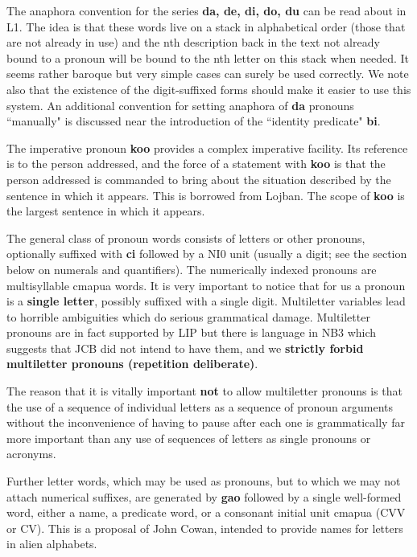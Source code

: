 \documentclass[12pt]{book}
\begin{document}
The anaphora convention for the series {\bf da, de, di, do, du} can be read about in L1.  The idea is that these words live on a stack in alphabetical order (those that are not already in use) and the nth description back in the text not already bound to a pronoun will be bound to the nth letter on this stack when needed.   It seems rather baroque but very simple cases can surely be used correctly.  We note also that the existence of the digit-suffixed forms should make it easier to use this system.  An additional convention for setting anaphora of {\bf da} pronouns ``manually" is discussed near the introduction of the ``identity predicate" {\bf bi}.

The imperative pronoun {\bf koo} provides a complex imperative facility.  Its reference is to the person addressed, and the force of a statement with {\bf koo} is that the person addressed is commanded to bring about the situation described by the sentence in which it appears.  This is borrowed from Lojban.  The scope of {\bf koo} is the largest sentence in which it appears.

The general class of pronoun words consists of letters or other pronouns, optionally suffixed with {\bf ci} followed by a NI0 unit (usually a digit; see the section below on numerals and quantifiers).     The numerically indexed pronouns are multisyllable cmapua words.  It is very important
to notice that for us a pronoun is a {\bf single letter}, possibly suffixed with a single digit.  Multiletter variables lead to horrible ambiguities which do serious grammatical damage.
Multiletter pronouns are in fact supported by LIP but there is language in NB3 which suggests that JCB did not intend to have them, and we {\bf strictly forbid multiletter pronouns (repetition deliberate)}.

The reason that it is vitally important {\bf not} to allow multiletter pronouns is that the use of a sequence of individual letters as a sequence of pronoun arguments without the inconvenience of having to pause after each one is grammatically far more important than any use of sequences of letters as single pronouns or acronyms.

Further letter words, which may be used as pronouns, but to which we may not attach numerical suffixes, are generated by {\bf gao} followed by a single well-formed word, either a name, a predicate word, or a consonant initial unit cmapua (CVV or CV).
This is a proposal of John Cowan, intended to provide names for letters in alien alphabets.
\end{document}
